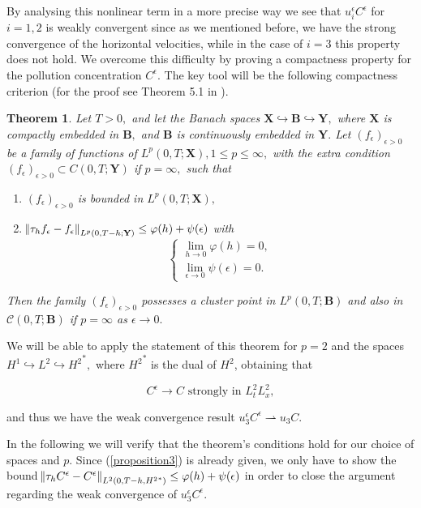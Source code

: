 \documentclass[11pt]{article}
\newtheorem{theorem}{Theorem}
\begin{document}
By analysing this nonlinear term in a more precise way we see that $u^\epsilon_i C^\epsilon$ for $i=1,2$ is weakly convergent since as we mentioned before, we have the strong convergence of the horizontal velocities, while in the case of $i=3$ this property does not hold. We overcome this difficulty by proving a compactness property for the pollution concentration $C^\epsilon.$ The key tool will be the following compactness criterion (for the proof see Theorem 5.1 in \cite{azerad2001mathematical}).

\begin{theorem}
Let $T>0,$ and let the Banach spaces $\mathbf{X} \hookrightarrow \mathbf{B} \hookrightarrow \mathbf{Y},$ where $\mathbf{X}$ is compactly embedded in $\mathbf{B},$ and $\mathbf{B}$ is continuously embedded in $\mathbf{Y}.$ Let $(f_\epsilon)_{\epsilon>0}$ be a family of functions of $L^p (0,T; \mathbf{X}), 1 \leq p \leq \infty,$ with the extra condition $(f_\epsilon)_{\epsilon>0} \subset C (0,T; \mathbf{Y})$ if $p = \infty,$ such that
\begin{enumerate}
  \item $(f_\epsilon)_{\epsilon>0}$ is bounded in $L^p (0,T; \mathbf{X}),$
  \item $\norm{\tau_h f_\epsilon - f_\epsilon}_{L^p(0,T-h; \mathbf{Y})} \leq \varphi(h) + \psi(\epsilon)$ with
  $$
    \begin{cases}
      \lim_{h \to 0} \varphi(h) = 0,\\
      \lim_{\epsilon \to 0} \psi(\epsilon) = 0.
    \end{cases}
  $$
  \end{enumerate}
  
Then the family $(f_\epsilon)_{\epsilon>0}$ possesses a cluster point in $L^p (0,T; \mathbf{B})$ and also in $\mathcal{C}(0,T; \mathbf{B})$ if $p = \infty$ as $\epsilon \to 0.$
\end{theorem}

We will be able to apply the statement of this theorem for $p=2$ and the spaces $H^1 \hookrightarrow L^2 \hookrightarrow {H^2}^*,$ where ${H^2}^*$ is the dual of ${H^2}$, obtaining that

\[C^\epsilon \to C \text{ strongly in } L^2_t L^2_x,\]

and thus we have the weak convergence result $u^\epsilon_3 C^\epsilon \rightharpoonup u_3 C.$

In the following we will verify that the theorem's conditions hold for our choice of spaces and $p$. Since (\ref{proposition3}) is already given, we only have to show the bound $\norm{\tau_h C^\epsilon - C^\epsilon}_{L^2(0,T-h, {H^2}^*)} \leq \varphi(h) + \psi(\epsilon)$ in order to close the argument regarding the weak convergence of $u^\epsilon_3 C^\epsilon$.
\end{document}
